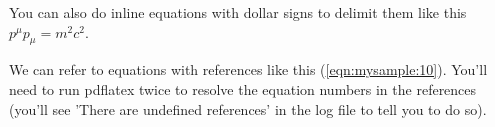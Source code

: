 \documentclass{article}
\begin{document}
You can also do inline equations with dollar signs to delimit them like this $p^\mu p_\mu = m^2 c^2$.

We can refer to equations with references like this (\ref{eqn:mysample:10}).  You'll need to run pdflatex twice to resolve the equation numbers in the references (you'll see 'There are undefined references' in the log file to tell you to do so).
\end{document}
